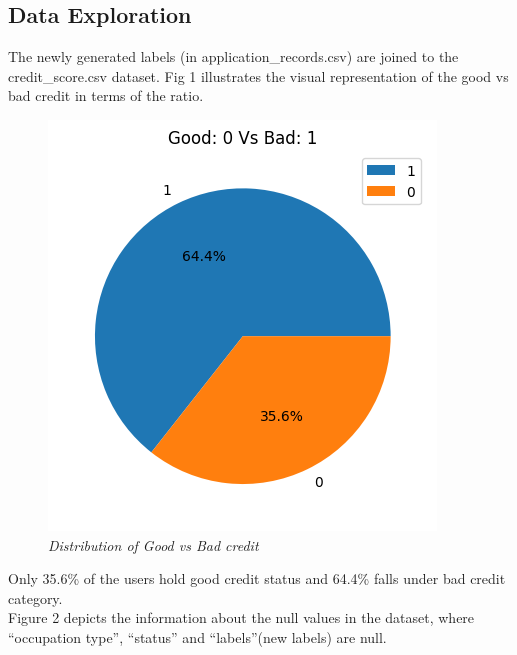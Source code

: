 \documentclass[10pt]{article}
\begin{document}
\begin{multicols}{2}
\section{Data Exploration}
The newly generated labels (in application\_records.csv) are joined to the credit\_score.csv dataset. Fig 1 illustrates the visual representation of the good vs bad credit in terms of the ratio. 
\vspace{-3mm} 
\begin{figure}[H]
    \centering
    \includegraphics[width=1\linewidth]{fig1.png}
    \caption{\justifying \textit{Distribution of Good vs Bad credit}}
    \label{fig:PID Fuzzy}
\end{figure}
\vspace{-5mm} 
Only 35.6\% of the users hold good credit status and 64.4\% falls under bad credit category. \\ \newline \newline Figure 2 depicts the information about the null values in the dataset, where “occupation type”, “status” and “labels”(new labels) are null. 


\end{multicols}
\end{document}
